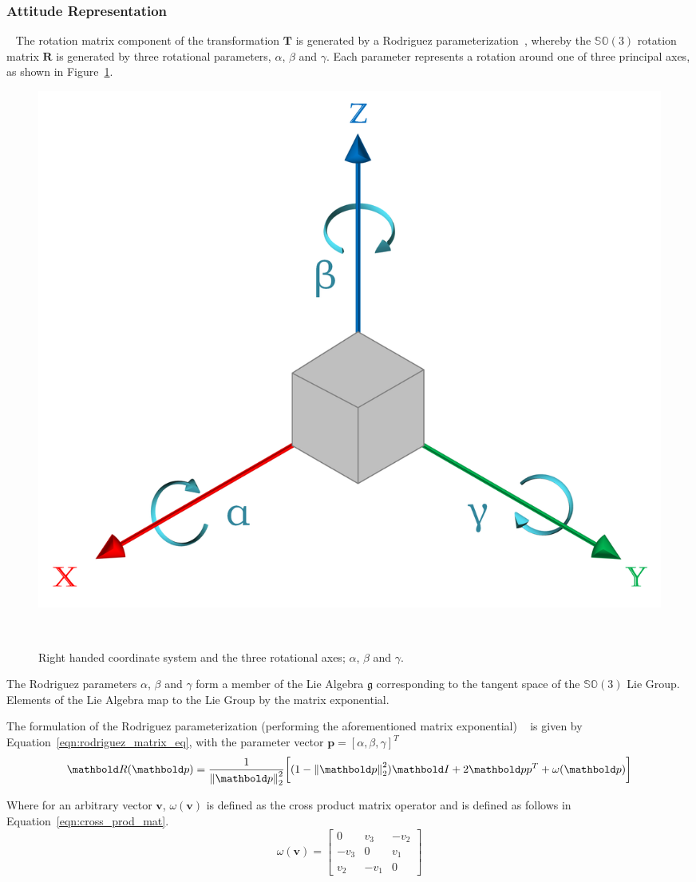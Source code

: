 \subsubsection{Attitude Representation}
~\label{subsub:moseg_static_camera_attitude}
The rotation matrix component of the transformation \(\bm{T}\) is
generated by a Rodriguez parameterization~\cite{Shuster1993}, whereby the
\(\mathbb{SO}(3)\) rotation matrix \(\bm{R}\) is generated by three rotational
parameters, \( \alpha \), \( \beta \) and \( \gamma \). Each parameter represents a 
rotation around one of three principal axes, as shown in Figure~\ref{figure:euler_axes}.
\begin{figure}[!htbp]
  \centering
  \includegraphics[width=.6\linewidth]{figures/moseg/euler_angles.png}
  \caption[Rotational Axes]{Right handed coordinate system and the three rotational axes; 
  \( \alpha \), \( \beta \) and \( \gamma \).}
~\label{figure:euler_axes}
\end{figure}
The Rodriguez parameters \( \alpha \), \( \beta \) and \( \gamma \) form a member of the Lie Algebra 
\( \mathfrak{g} \) corresponding to the tangent space of the \( \mathbb{SO}(3) \) Lie Group. Elements 
of the Lie Algebra map to the Lie Group by the matrix exponential.

The formulation of the Rodriguez parameterization (performing the aforementioned matrix exponential)
~\cite{Shuster1993} is given by Equation~\ref{eqn:rodriguez_matrix_eq}, with the parameter vector
\(\bm{p} = {[\alpha, \beta, \gamma]}^{T}\)
\begin{equation}
  \label{eqn:rodriguez_matrix_eq}
  \bm{R}(\bm{p}) =
  \frac{1}{\norm{\bm{p}}^{2}}
  \bigg[
  (1 - \norm{\bm{p}}^{2})\bm{I} +
  2 \bm{pp}^{T} + \omega(\bm{p})
  \bigg]
\end{equation}

Where for an arbitrary vector \(\bm{v}\), \(\omega(\bm{v})\) is defined as
the cross product matrix operator and is defined as follows in Equation~\ref{eqn:cross_prod_mat}.
\begin{equation}
  \label{eqn:cross_prod_mat}
  \omega(\bm{v}) =
  \begin{bmatrix}
    0 & v_{3} & -v_{2} \\
    -v_{3} & 0 & v_{1} \\
    v_{2} & -v_{1} & 0
  \end{bmatrix}
\end{equation}

